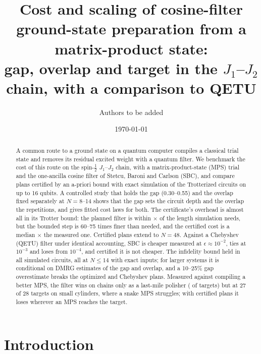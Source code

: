 \documentclass[aps,pra,twocolumn,superscriptaddress,nofootinbib]{revtex4-2}
\begin{document}
\title{Cost and scaling of cosine-filter ground-state preparation from a matrix-product state:\\
gap, overlap and target in the $J_1$--$J_2$ chain, with a comparison to QETU}

\author{Authors to be added}
\date{\today}

\begin{abstract}
A common route to a ground state on a quantum computer compiles a classical trial state and removes its residual
excited weight with a quantum filter. We benchmark the cost of this route on the spin-$\tfrac12$ $J_1$--$J_2$
chain, with a matrix-product-state (MPS) trial and the one-ancilla cosine filter of Stetcu, Baroni and Carlson
(SBC), and compare plans certified by an a-priori bound with exact simulation of the Trotterized circuits on up to
16 qubits. A controlled study that holds the gap (0.30--0.55) and the overlap fixed separately at $N=8$--14 shows
that the gap sets the circuit depth and the overlap the repetitions, and gives fitted cost laws for both. The
certificate's overhead is almost all in its Trotter bound: the planned filter is within \fCMDtime$\times$ of the
length simulation needs, but the bounded step is 60--75 times finer than needed, and the certified cost is a median
\goCertRatioMed$\times$ the measured one. Certified plans extend to $N=48$. Against a Chebyshev (QETU) filter under
identical accounting, SBC is cheaper measured at $\epsilon\approx10^{-2}$, ties at $10^{-3}$ and loses from
$10^{-4}$, and certified it is not cheaper. The infidelity bound held in all \nSimOK{} simulated circuits, all at
$N\le14$ with exact inputs; for larger systems it is conditional on DMRG estimates of the gap and overlap, and a
10--25\% gap overestimate breaks the optimized and Chebyshev plans. Measured against compiling a better MPS, the
filter wins on chains only as a last-mile polisher (\actOneWins{} of \actOneTot{} targets) but at 27 of 28 targets on
small cylinders, where a snake MPS struggles; with certified plans it loses wherever an MPS reaches the target.
\end{abstract}

\maketitle

\section{Introduction}
\end{document}
